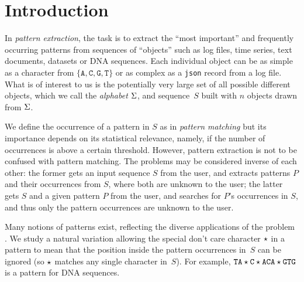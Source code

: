 \section{Introduction}\label{sec:pe-introduction}
In \emph{pattern extraction}, the task is to extract the ``most important'' and frequently occurring patterns from sequences of ``objects'' such as log files, time series, text documents, datasets or DNA sequences. Each individual object can be as simple as a character from $\{ \mathtt{A}, \mathtt{C}, \mathtt{G}, \mathtt{T} \}$ or as complex as a \texttt{json} record from a log file. What is of interest to us is the potentially very large set of all possible different objects, which we call the \emph{alphabet} $\Sigma$, and  sequence~$S$ built with $n$ objects drawn from $\Sigma$. 

We define the occurrence of a pattern in $S$ as in \emph{pattern   matching} but its importance depends on its statistical relevance, namely, if the number of occurrences is above a certain threshold. However, pattern extraction is not to be confused with pattern matching. The problems may be considered inverse of each other: the former gets an input sequence $S$ from the user, and extracts patterns $P$ and their occurrences from $S$, where both are unknown to the user; the latter gets $S$ and a given pattern $P$ from the user, and searches for $P$'s occurrences in $S$, and thus only the pattern occurrences are unknown to the user.

Many notions of patterns exist, reflecting the diverse applications of the problem
\cite{grossi2011madmx, arimura2007efficient, sagot1998spelling, tcsUkkonen09}. We study a natural variation allowing the special don't care character $\star$ in a pattern to mean that the position inside the pattern occurrences in~$S$ can be ignored (so $\star$ matches any single character in~$S$). For example, $\mathtt{TA}\star\mathtt{C}\star \mathtt{ACA}\star \mathtt{GTG}$ is a pattern for DNA sequences.

